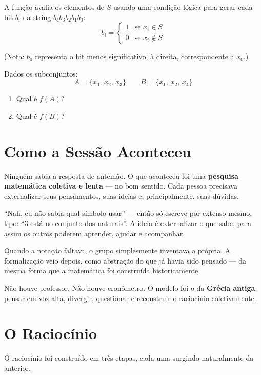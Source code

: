 \documentclass[12pt, a4paper]{article}
\begin{document}
A função avalia os elementos de $S$ usando uma condição lógica para gerar cada bit $b_i$ da string $b_4b_3b_2b_1b_0$:
$$
b_i =
\begin{cases}
    1 & \text{se } x_i \in S \\
    0 & \text{se } x_i \notin S
\end{cases}
$$

\noindent(Nota: $b_0$ representa o bit menos significativo, à direita, correspondente a $x_0$.)

Dados os subconjuntos:
$$A = \{x_0,\, x_2,\, x_3\} \qquad B = \{x_1,\, x_2,\, x_4\}$$

\begin{enumerate}
  \item Qual é $f(A)$?
  \item Qual é $f(B)$?
\end{enumerate}

\section{Como a Sessão Aconteceu}

Ninguém sabia a resposta de antemão. O que aconteceu foi uma \textbf{pesquisa matemática coletiva e lenta} --- no bom sentido. Cada pessoa precisava externalizar seus pensamentos, suas ideias e, principalmente, suas dúvidas.

\begin{citacao}
``Nah, eu não sabia qual símbolo usar'' --- então só escreve por extenso mesmo, tipo: ``3 está no conjunto dos naturais''. A ideia é externalizar o que sabe, para assim os outros poderem aprender, ajudar e acompanhar.
\end{citacao}

Quando a notação faltava, o grupo simplesmente inventava a própria. A formalização veio depois, como abstração do que já havia sido pensado --- da mesma forma que a matemática foi construída historicamente.

Não houve professor. Não houve cronômetro. O modelo foi o da \textbf{Grécia antiga}: pensar em voz alta, divergir, questionar e reconstruir o raciocínio coletivamente.

\section{O Raciocínio}

O raciocínio foi construído em três etapas, cada uma surgindo naturalmente da anterior.
\end{document}
